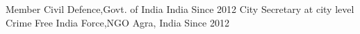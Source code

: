 \begin{cventries}
  \cventry
    {Member}
    {Civil Defence,Govt. of India}
    {India}
    {Since 2012}
    {
    }
    \cventry
    {City Secretary at city level}
    {Crime Free India Force,NGO}
    {Agra, India}
    {Since 2012}
    {
    }
    
\end{cventries}
